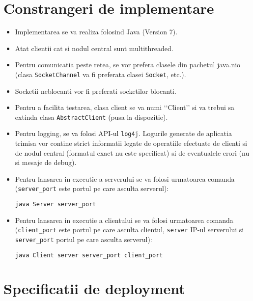 \documentclass[a4paper]{article}
\begin{document}
\section{Constrangeri de implementare}
\label{sec4}

\begin{itemize}[noitemsep]
	\item Implementarea se va realiza folosind Java (Version 7).
	\item Atat clientii cat si nodul central sunt multithreaded.
	\item Pentru comunicatia peste retea, se vor prefera clasele din pachetul java.nio (clasa \texttt{SocketChannel} va fi preferata clasei \texttt{Socket}, etc.).
	\item Socketii neblocanti vor fi preferati socketilor blocanti.
	\item Pentru a facilita testarea, clasa client se va numi \lq\lq{}Client\rq\rq{} si va trebui sa extinda clasa \texttt{AbstractClient} (pusa la dispozitie).
	\item Pentru logging, se va folosi API-ul \texttt{log4j}. Logurile generate de aplicatia trimisa vor contine strict informatii legate de operatiile efectuate de clienti si de nodul central (formatul exact nu este specificat) si de eventualele erori (nu si mesaje de debug).
	\item Pentru lansarea in executie a serverului se va folosi urmatoarea comanda (\texttt{server\_port} este portul pe care asculta serverul):

\begin{verbatim}
java Server server_port
\end{verbatim}

	\item Pentru lansarea in executie a clientului se va folosi urmatoarea comanda (\texttt{client\_port} este portul pe care asculta clientul, \texttt{server} IP-ul serverului si \texttt{server\_port} portul pe care asculta serverul):

\begin{verbatim}	
java Client server server_port client_port
\end{verbatim}

\end{itemize}

\section{Specificatii de deployment}
\label{sec5}
\end{document}
